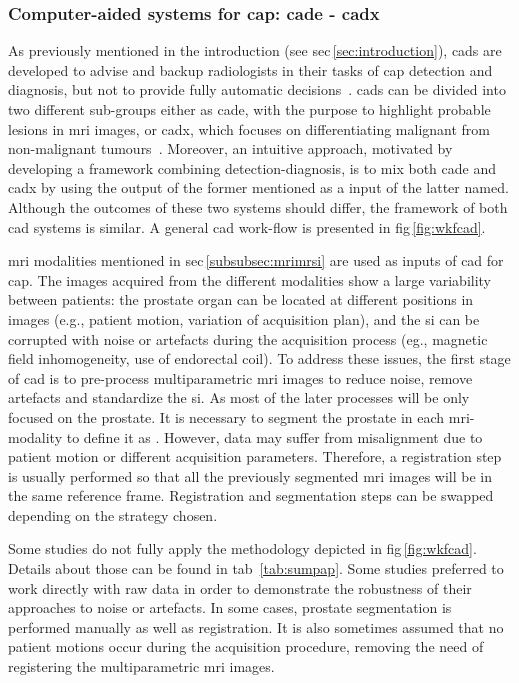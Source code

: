 \subsubsection{Computer-aided systems for \ac{cap}: \ac{cade} - \ac{cadx}} \label{subsubsec:CAD}

As previously mentioned in the introduction (see \acs{sec}\,\ref{sec:introduction}), \acp{cad} are developed to advise and backup radiologists in their tasks of \ac{cap} detection and diagnosis, but not to provide fully automatic decisions~\cite{Giger2008}. \acp{cad} can be divided into two different sub-groups either as \ac{cade}, with the purpose to highlight probable lesions in \ac{mri} images, or \ac{cadx}, which focuses on differentiating malignant from non-malignant tumours~\cite{Giger2008}. Moreover, an intuitive approach, motivated by developing a framework combining detection-diagnosis, is to mix both \ac{cade} and \ac{cadx} by using the output of the former mentioned as a input of the latter named. Although the outcomes of these two systems should differ, the framework of both \ac{cad} systems is similar. A general \ac{cad} work-flow is presented in \acs{fig}\,\ref{fig:wkfcad}.

\ac{mri} modalities mentioned in \acs{sec}\,\ref{subsubsec:mrimrsi} are used as inputs of \ac{cad} for \ac{cap}. The images acquired from the different modalities show a large variability between patients: the prostate organ can be located at different positions in images (e.g., patient motion, variation of acquisition plan), and the \ac{si} can be corrupted with noise or artefacts during the acquisition process (eg., magnetic field inhomogeneity, use of endorectal coil). To address these issues, the first stage of \ac{cad} is to pre-process multiparametric \ac{mri} images to reduce noise, remove artefacts and standardize the \ac{si}. As most of the later processes will be only focused on the prostate. It is necessary to segment the prostate in each \ac{mri}-modality to define it as . However, data may suffer from misalignment due to patient motion or different acquisition parameters. Therefore, a registration step is usually performed so that all the previously segmented \ac{mri} images will be in the same reference frame. Registration and segmentation steps can be swapped depending on the strategy chosen.

Some studies do not fully apply the methodology depicted in \acs{fig}\,\ref{fig:wkfcad}. Details about those can be found in \acs{tab}~\ref{tab:sumpap}. Some studies preferred to work directly with raw data in order to demonstrate the robustness of their approaches to noise or artefacts. In some cases, prostate segmentation is performed manually as well as registration. It is also sometimes assumed that no patient motions occur during the acquisition procedure, removing the need of registering the multiparametric \ac{mri} images.

